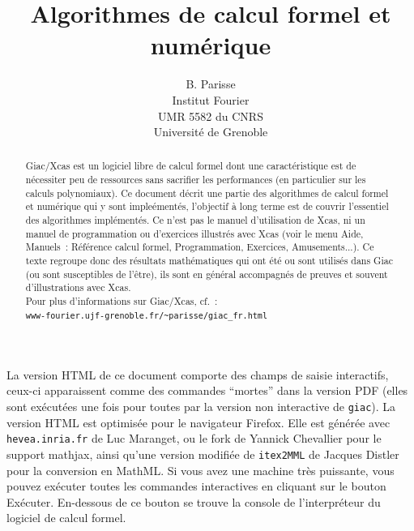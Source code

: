 \documentclass[a4paper,11pt]{article}
\title {Algorithmes de calcul formel et num\'erique}
\author{B. Parisse\\Institut Fourier\\UMR 5582 du CNRS
\\Université de Grenoble}
\date{}
\begin{document}
\begin{giacjshere} %

\maketitle

\ifhevea
\newcommand{\R}{{\mathbb{R}}}
\newcommand{\C}{{\mathbb{C}}}
\newcommand{\Z}{{\mathbb{Z}}}
\newcommand{\N}{{\mathbb{N}}}
\newcommand{\Q}{{\mathbb{Q}}}
\newcommand{\tr}{\mbox{tr\,}}
\else
\newcommand{\R}{{\mathbb{R}}}
\newcommand{\C}{{\mathbb{C}}}
\newcommand{\Z}{{\mathbb{Z}}}
\newcommand{\N}{{\mathbb{N}}}
\newcommand{\Q}{{\mathbb{Q}}}
\newcommand{\tr}{\mbox{tr\,}}
\fi

La version HTML de ce document comporte des champs de saisie
interactifs, ceux-ci apparaissent comme des commandes ``mortes'' dans
la version PDF (elles sont ex\'ecut\'ees une fois pour toutes
par la version non interactive de \verb|giac|). 
La version HTML est optimis\'ee pour le navigateur Firefox. 
Elle est g\'en\'er\'ee avec \verb|hevea.inria.fr| de Luc Maranget,
ou le fork de Yannick Chevallier pour le support mathjax, ainsi
qu'une version modifi\'ee de \verb|itex2MML| 
de Jacques Distler pour la conversion en MathML.
Si vous avez une machine tr\`es puissante, vous pouvez
ex\'ecuter toutes les commandes interactives en cliquant sur le bouton
Ex\'ecuter. En-dessous de ce bouton se trouve 
la console de l'interpr\'eteur du
logiciel de calcul formel.


\begin{abstract}
Giac/Xcas est un logiciel libre de calcul formel dont
une caract\'eristique est de n\'ecessiter peu de ressources sans
sacrifier les performances (en particulier sur les calculs polynomiaux).
 Ce document d\'ecrit une partie des algorithmes de calcul formel et
 num\'erique qui y sont
imple\'ement\'es, l'objectif \`a long terme
est de couvrir l'essentiel des algorithmes impl\'ement\'es.
Ce n'est pas le manuel d'utilisation de Xcas, ni un manuel de programmation
ou d'exercices illustr\'es avec Xcas (voir le menu Aide, Manuels~:
R\'ef\'erence calcul formel, Programmation, Exercices, Amusements...).
Ce texte regroupe donc des r\'esultats
math\'ematiques qui ont \'et\'e ou sont utilis\'es dans Giac
(ou sont susceptibles de l'\^etre),
ils sont en g\'en\'eral accompagn\'es de preuves 
et souvent d'illustrations avec Xcas.\\
Pour plus d'informations sur Giac/Xcas, cf.~:\\
\verb|www-fourier.ujf-grenoble.fr/~parisse/giac_fr.html|
\end{abstract}


\end{giacjshere}
\end{document}
